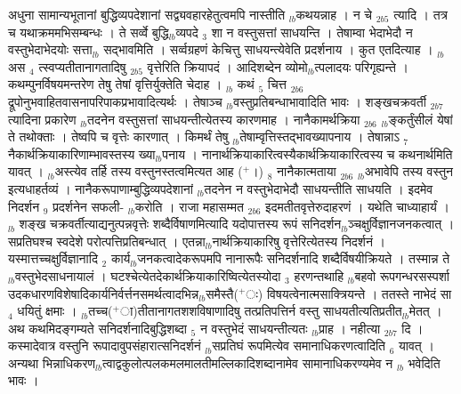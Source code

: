 \documentclass[article,12pt,a4paper]{memoir}%
\newcommand{\add}[1]{($^{+}$#1)}
\begin{document}
	  
	  \pstart \leavevmode%
	अधुना सामान्यभूतानां बुद्धिव्यपदेशानां सद्व्यवहारहेतुत्वमपि नास्तीति {\tiny $_{lb}$}कथयन्नाह । {\color{DodgerBlue3}न चे} {\tiny $_{2b5}$} त्यादि । तत्र च यथाक्रममभिसम्बन्धः । ते सर्व्वे बुद्धि{\tiny $_{lb}$}व्यपदे {\tiny $_{3}$} शा न वस्तुसत्तां साधयन्ति । तेषाम्वा भेदाभेदौ न वस्तुभेदाभेदयोः सत्ता{\tiny $_{lb}$} \leavevmode{} सद्भावमिति । सर्व्वग्रहणं केचित्तु साधयन्त्येवेति प्रदर्शनाय । कुत एतदित्याह । {\tiny $_{lb}$} {\color{DodgerBlue3}अस {\tiny $_{4}$} त्स्वप्यतीतानागतादिषु} {\tiny $_{2b5}$} वृत्तेरिति क्रियापदं । आदिशब्देन व्योमो{\tiny $_{lb}$}त्पलादयः परिगृह्यन्ते । कथम्पुनर्विषयमन्तरेण तेषु तेषां वृत्तिर्युक्तेति चेदाह । {\tiny $_{lb}$} {\color{DodgerBlue3}कथं {\tiny $_{5}$} चित्त} {\tiny $_{2b6}$} द्रूपोनुभवाहितवासनापरिपाकप्रभावादित्यर्थः । तेषाञ्च {\tiny $_{lb}$}वस्तुप्रतिबन्धाभावादिति भावः । {\color{DodgerBlue3}शङ्खचक्रवर्ती} {\tiny $_{2b7}$} त्यादिना प्रकारेण {\tiny $_{lb}$}तदनेन वस्तुसत्तां साधयन्तीत्येतस्य कारणमाह । {\color{DodgerBlue3}नानैकामर्थक्रिया} {\tiny $_{2b6}$} {\tiny $_{lb}$}ङ्कर्तुंसीलं येषां ते तथोक्ताः । तेष्वपि च वृत्तेः कारणात् । किमर्थं तेषु {\tiny $_{lb}$}तेषाम्वृत्तिस्तद्भावख्यापनाय । तेषान्नाऽ {\tiny $_{7}$} नैकार्थक्रियाकारिणाम्भावस्तस्य ख्या{\tiny $_{lb}$}पनाय । नानार्थक्रियाकारित्वस्यैकार्थक्रियाकारित्वस्य च कथनार्थमिति यावत् । {\tiny $_{lb}$}अस्त्येव तर्हि तस्य वस्तुनस्तत्वमित्यत आह \add{।} {\tiny $_{8}$} {\color{DodgerBlue3}नानैकात्मताया} {\tiny $_{2b6}$} {\tiny $_{lb}$}अभावेपि तस्य वस्तुन इत्यधाहर्तव्यं । नानैकरूपाणाम्बुद्धिव्यपदेशानां {\tiny $_{lb}$}तदनेन न वस्तुभेदाभेदौ साधयन्तीति साधयति । इदमेव निदर्शन {\tiny $_{9}$} \leavevmode{} प्रदर्शनेन सफली- {\tiny $_{lb}$}करोति । {\color{DodgerBlue3}राजा महासम्मत} {\tiny $_{2b6}$} इदमतीतवृत्तेरुदाहरणं । यथेति चाध्याहार्यं । {\tiny $_{lb}$} {\color{DodgerBlue3}शङ्ख} चक्रवर्तीत्याद्यनुत्पन्नवृत्तेः शब्दैर्विषाणमित्यादि यदोपात्तस्य रूपं सनिदर्शन{\tiny $_{lb}$}ञ्चक्षुर्विज्ञानजनकत्वात् । सप्रतिघश्च स्वदेशे परोत्पत्तिप्रतिबन्धात् । एतन्ना{\tiny $_{lb}$}नार्थक्रियाकारिषु वृत्तेरित्येतस्य निदर्शनं । यस्मात्तच्चक्षुर्विज्ञानादि {\tiny $_{2}$} कार्य{\tiny $_{lb}$}जनकत्वादेकरूपमपि नानारूपैः सनिदर्शनादि शब्दैर्विषयीक्रियते । तस्मान्न ते {\tiny $_{lb}$}वस्तुभेदसाधनायालं । घटश्चेत्येतदेकार्थक्रियाकारिष्वित्येतस्योदा {\tiny $_{3}$} हरणन्तथाहि {\tiny $_{lb}$}बहवो रूपगन्धरसस्पर्शा उदकधारणविशेषादिकार्यनिर्वर्त्तनसमर्थत्वादभिन्न{\tiny $_{lb}$}समैस्तै\add{ः} विषयत्वेनात्मसाक्त्रियन्ते । ततस्ते नाभेदं सा {\tiny $_{4}$} धयितुं क्षमाः । {\tiny $_{lb}$}तच्च\add{ा}तीतानागतशशविषाणादिषु तत्प्रतिपत्तिर्न वस्तु साधयतीत्यतिप्रतीत{\tiny $_{lb}$}मेतत् । अथ कथमिदङ्गम्यते सनिदर्शनादिबुद्धिशब्दा {\tiny $_{5}$} न वस्तुभेदं साधयन्तीत्यतः {\tiny $_{lb}$}प्राह । {\color{DodgerBlue3}नहीत्या} {\tiny $_{2b7}$} दि । कस्मादेवात्र वस्तुनि रूपादावुपसंहारात्सनिदर्शनं {\tiny $_{lb}$}सप्रतिघं रूपमित्येव समानाधिकरणत्वादिति {\tiny $_{6}$} यावत् । अन्यथा भिन्नाधिकरण{\tiny $_{lb}$}त्वाद्वकुलोत्पलकमलमालतीमल्लिकादिशब्दानामेव सामानाधिकरण्यमेव न {\tiny $_{lb}$} \leavevmode{} भवेदिति भावः । 
\end{document}
